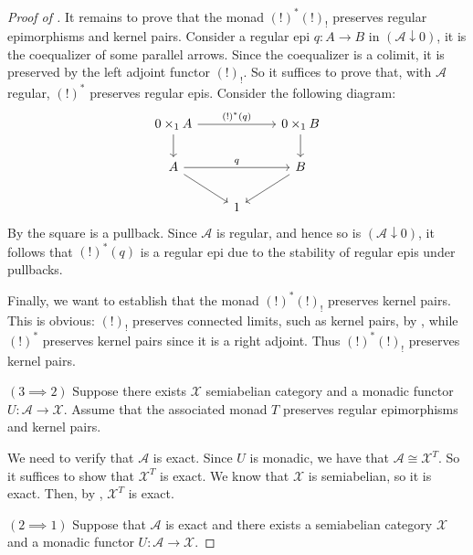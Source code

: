 \begin{subbox}{}
\begin{proof}[\textit{Proof of }]
    It remains to prove that the monad $(!)^*(!)_!$ preserves regular epimorphisms and kernel pairs. Consider a regular epi $q:A \to B$ in $(\mathcal{A} \downarrow 0)$, it is the coequalizer of some parallel arrows. Since the coequalizer is a colimit, it is preserved by the left adjoint functor $(!)_!$. So it suffices to prove that, with $\mathcal{A}$ regular, $(!)^*$ preserves regular epis. Consider the following diagram:
    \[%
    \begin{tikzcd}
    0\times_1A \arrow[d] \arrow[rr, "(!)^*(q)"] &   & 0\times_1B \arrow[d] \\
    A \arrow[rr, "q"] \arrow[rd]                &   & B \arrow[ld]         \\
                                                & 1 &                     
    \end{tikzcd}
    \]
    By  the square is a pullback. Since $\mathcal{A}$ is regular, and hence so is $(\mathcal{A} \downarrow 0)$, it follows that $(!)^*(q)$ is a regular epi due to the stability of regular epis under pullbacks.

    Finally, we want to establish that the monad $(!)^*(!)_!$ preserves kernel pairs. This is obvious: $(!)_!$ preserves connected limits, such as kernel pairs, by , while $(!)^*$ preserves kernel pairs since it is a right adjoint. Thus $(!)^*(!)_!$ preserves kernel pairs.

    $\mathit{(3 \implies 2)}$ Suppose there exists $\mathcal{X}$ semiabelian category and a monadic functor $U: \mathcal{A} \to \mathcal{X}$. Assume that the associated monad $T$ preserves regular epimorphisms and kernel pairs.
    
    We need to verify that $\mathcal{A}$ is exact. Since $U$ is monadic, we have that $\mathcal{A} \cong \mathcal{X}^T$. So it suffices to show that $\mathcal{X}^T$ is exact. We know that $\mathcal{X}$ is semiabelian, so it is exact. Then, by , $\mathcal{X}^T$ is exact.

    $\mathit{(2 \implies 1)}$ Suppose that $\mathcal{A}$ is exact and there exists a semiabelian category $\mathcal{X}$ and a monadic functor $U: \mathcal{A} \to \mathcal{X}$.


\end{proof}
\end{subbox}
